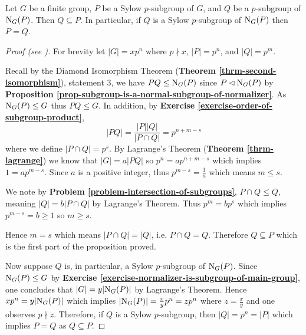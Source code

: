 \begin{proposition}\label{prop-normalizer-of-sylow-p-subgroup}
    Let $G$ be a finite group, $P$ be a Sylow $p$-subgroup of $G$, and $Q$ be a $p$-subgroup of $\mathrm{N}_{G}(P)$. Then $Q \subseteq P$. In particular, if $Q$ is a Sylow $p$-subgroup of $\mathrm{N}_{G}(P)$ then $P = Q$.
\end{proposition}
\begin{proof}[Proof (see {\cite[Proposition 11.9]{humphreys_1996}})]
    For brevity let $|G| = xp^n$ where $p \nmid x$, $|P| = p^n$, and $|Q| = p^m$.

    Recall by the Diamond Isomorphism Theorem (\textbf{Theorem \ref{thrm-second-isomorphism}}), statement 3, we have $PQ \leq \mathrm{N}_{G}(P)$ since $P \lhd \mathrm{N}_{G}(P)$ by \textbf{Proposition \ref{prop-subgroup-is-a-normal-subgroup-of-normalizer}}. As $\mathrm{N}_{G}(P) \leq G$ thus $PQ \leq G$. In addition, by \textbf{Exercise \ref{exercise-order-of-subgroup-product}},
    \[
        |PQ| = \frac{|P||Q|}{|P \cap Q|} = p^{n+m-s}
    \]
    where we define $|P \cap Q| = p^s$. By Lagrange's Theorem (\textbf{Theorem \ref{thrm-lagrange}}) we know that $|G| = a|PQ|$ so $p^n = ap^{n+m-s}$ which implies $1 = ap^{m-s}$. Since $a$ is a positive integer, thus $p^{m-s} = \frac 1a$ which means $m \leq s$.

    We note by \textbf{Problem \ref{problem-intersection-of-subgroups}}, $P \cap Q \leq Q$, meaning $|Q| = b|P\cap Q|$ by Lagrange's Theorem. Thus $p^m = bp^s$ which implies $p^{m-s} = b \geq 1$ so $m \geq s$.

    Hence $m = s$ which means $|P \cap Q| = |Q|$, i.e. $P \cap Q = Q$. Therefore $Q \subseteq P$ which is the first part of the proposition proved.

    Now suppose $Q$ is, in particular, a Sylow $p$-subgroup of $\mathrm{N}_{G}(P)$. Since $\mathrm{N}_{G}(P) \leq G$ by \textbf{Exercise \ref{exercise-normalizer-is-subgroup-of-main-group}}, one concludes that $|G| = y|\mathrm{N}_{G}(P)|$ by Lagrange's Theorem. Hence $xp^n = y|\mathrm{N}_{G}(P)|$ which implies $|\mathrm{N}_{G}(P)| = \frac{x}{y} p^n = zp^n$ where $z = \frac xy$ and one observes $p \nmid z$. Therefore, if $Q$ is a Sylow $p$-subgroup, then $|Q| = p^n = |P|$ which implies $P = Q$ as $Q \subseteq P$.
\end{proof}



